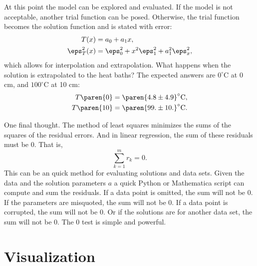 At this point the model can be explored and evaluated. If the model is not acceptable, another trial function can be posed. Otherwise, the trial function becomes the solution function and is stated with error:
  \begin{equation*}   %
  \begin{split}
    T(x)         & = a_{0} + a_{1} x, \\
    \eps_{T}^{2}(x) & = \eps_{0}^{2} + x^{2} \eps_{1}^{2} + a_{1}^{2} \eps_{x}^{2} , \\
  \end{split}
  \end{equation*}
which allows for interpolation and extrapolation. What happens when the solution is extrapolated to the heat baths? The expected answers are $0^{\circ}$C at 0 cm, and $100^{\circ}$C at 10 cm:
  \begin{equation*}   %
  \begin{split}
      T \paren{0} &= \paren{ 4.8 \pm 4.9 }^{\circ}\mathrm{C}, \\
      T \paren{10} &= \paren{ 99. \pm 10. }^{\circ}\mathrm{C}.
  \end{split}
  \end{equation*}
  
One final thought. The method of least squares minimizes the sums of the squares of the residual errors. And in linear regression, the sum of these residuals must be 0. That is,
  \begin{equation*}   %
    \sum_{k=1}^{m} r_{k} = 0 .
  \end{equation*}
This can be an quick method for evaluating solutions and data sets. Given the data and the solution parameters $a$ a quick Python or Mathematica script can compute and sum the residuals. If a data point is omitted, the sum will not be 0. If the parameters are misquoted, the sum will not be 0. If a data point is corrupted, the sum will not be 0. Or if the solutions are for another data set, the sum will not be 0. The 0 test is simple and powerful.

\section{Visualization}  %

